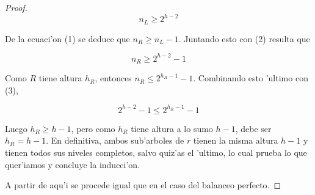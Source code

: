 \begin{teo}
\begin{proof}
\begin{equation}
	n_L \geq 2^{h - 2}
\end{equation}	

	 De la ecuaci'on (1) se deduce que $n_R \geq n_L - 1$. Juntando esto con (2) resulta que 

\begin{equation}
	n_R \geq 2^{h - 2} - 1
\end{equation}	
	
	Como $R$ tiene altura $h_R$, entonces $n_R \leq 2^{h_R - 1} - 1$. Combinando esto 'ultimo con (3),
	
\[2^{h - 2} - 1 \leq 2^{h_R - 1} - 1\]

Luego $h_R \geq h - 1$, pero como $h_R$ tiene altura a lo sumo $h - 1$, debe ser $h_R = h - 1$. En definitiva, ambos sub'arboles de $r$ tienen la misma altura $h - 1$ y tienen todos sus niveles completos, salvo quiz'as el 'ultimo, lo cual prueba lo que quer'iamos y concluye la inducci'on.

A partir de aqu'i se procede igual que en el caso del balanceo perfecto.

\end{proof}
\end{teo}